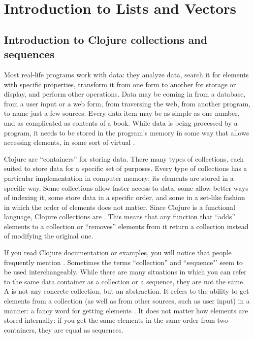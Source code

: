 \section{Introduction to Lists and Vectors}\label{sec:list-vectors}
\subsection{Introduction to Clojure collections and sequences}\label{subsec:coll-seq}
Most real-life programs work with data: they analyze data, search it for elements with specific properties, transform it from one form to another for storage or display, and perform other operations. Data may be coming in from a database, from a user input or a web form, from traversing the web,  from another program, to name just a few sources. Every data item may be as simple as one number, and as complicated as contents of a book. While data is being processed by a program, it needs to be stored in the program's memory in some way that allows accessing elements, in some sort of virtual . 

Clojure   are ``containers'' for storing data. There many types of collections, each suited to store data for a specific set of purposes. Every type of collections has a particular implementation in computer memory: its elements are stored in a specific way. Some collections allow faster access to data, some allow better ways of indexing it, some store data in a specific order, and some in a set-like fashion in which the order of elements does not matter. 
Since Clojure is a functional language, Clojure collections are . This means that any function that ``adds'' elements to a collection or ``removes'' elements from it return a  collection instead of modifying the original one.  

If you read Clojure documentation or examples, you will notice that people frequently mention . Sometimes the terms ``collection'' and ``sequence"' seem to be used interchangeably. While there are many situations in which you can refer to the same data container as a collection or a sequence, they are not the same. A  is not any concrete collection, but an abstraction. It refers to the ability to get elements from a collection (as well as from other sources, such as user input) in a  manner: a fancy word for getting elements . It does not matter how elements are stored internally: if you get the same elements in the same order from two containers, they are equal as sequences.


